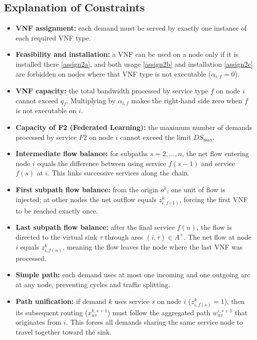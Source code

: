 \documentclass{article}
\begin{document}
\subsection*{Explanation of Constraints}
\begin{itemize}
    \item[\eqref{assign1}] \textbf{VNF assignment:} each demand must be served by exactly one instance of each required VNF type.
    \item[\eqref{assign2a}--\eqref{assign2c}] \textbf{Feasibility and installation:} a VNF can be used on a node only if it is installed there \eqref{assign2a}, and both usage \eqref{assign2b} and installation \eqref{assign2c} are forbidden on nodes where that VNF type is not executable ($\alpha_{i,f}=0$).
    \item[\eqref{capvnf}] \textbf{VNF capacity:} the total bandwidth processed by service type $f$ on node $i$ cannot exceed $q_f$. Multiplying by $\alpha_{i,f}$ makes the right‑hand side zero when $f$ is not executable on $i$.
    \item[\eqref{capF2}] \textbf{Capacity of F2 (Federated Learning):} the maximum number of demands processed by service $F2$ on node $i$ cannot exceed the limit $DS_{\max}$.
    \item[\eqref{flowinter}] \textbf{Intermediate flow balance:} for subpaths $s = 2,\dots,n$, the net flow entering node $i$ equals the difference between using service $f(s-1)$ and service $f(s)$ at $i$. This links successive services along the chain.
    \item[\eqref{flowfirst}] \textbf{First subpath flow balance:} from the origin $o^k$, one unit of flow is injected; at other nodes the net outflow equals $z_{i,f(1)}^k$, forcing the first VNF to be reached exactly once.
    \item[\eqref{flowlast}] \textbf{Last subpath flow balance:} after the final service $f(n)$, the flow is directed to the virtual sink $\tau$ through arcs $(i,\tau) \in A^+$. The net flow at node $i$ equals $z_{i,f(n)}^k$, meaning the flow leaves the node where the last VNF was processed.
    \item[\eqref{indegree}--\eqref{outdegree}] \textbf{Simple path:} each demand uses at most one incoming and one outgoing arc at any node, preventing cycles and traffic splitting.
    \item[\eqref{coupling}] \textbf{Path unification:} if demand $k$ uses service $s$ on node $i$ ($z_{i,f(s)}^k = 1$), then its subsequent routing ($x_{uv}^{k,s+1}$) must follow the aggregated path $w_{uv}^{i,s+1}$ that originates from $i$. This forces all demands sharing the same service node to travel together toward the sink.

\end{itemize}
\end{document}
